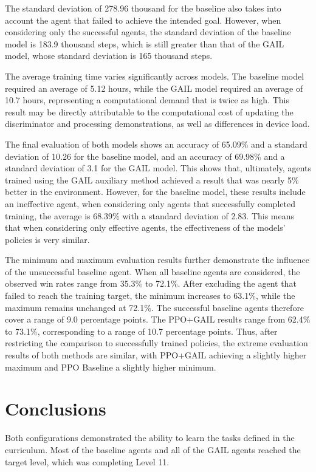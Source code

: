 The standard deviation of 278.96 thousand for the baseline also takes into account the agent that failed to achieve the intended goal. However, when considering only the successful agents, the standard deviation of the baseline model is 183.9 thousand steps, which is still greater than that of the GAIL model, whose standard deviation is 165 thousand steps.

The average training time varies significantly across models. The baseline model required an average of 5.12 hours, while the GAIL model required an average of 10.7 hours, representing a computational demand that is twice as high. This result may be directly attributable to the computational cost of updating the discriminator and processing demonstrations, as well as differences in device load.

The final evaluation of both models shows an accuracy of 65.09\% and a standard deviation of 10.26 for the baseline model, and an accuracy of 69.98\% and a standard deviation of 3.1 for the GAIL model. This shows that, ultimately, agents trained using the GAIL auxiliary method achieved a result that was nearly 5\% better in the environment. However, for the baseline model, these results include an ineffective agent, when considering only agents that successfully completed training, the average is 68.39\% with a standard deviation of 2.83. This means that when considering only effective agents, the effectiveness of the models’ policies is very similar.

The minimum and maximum evaluation results further demonstrate the influence of the unsuccessful baseline agent. When all baseline agents are considered, the observed win rates range from 35.3\% to 72.1\%. After excluding the agent that failed to reach the training target, the minimum increases to 63.1\%, while the maximum remains unchanged at 72.1\%. The successful baseline agents therefore cover a range of 9.0 percentage points. The PPO+GAIL results range from 62.4\% to 73.1\%, corresponding to a range of 10.7 percentage points. Thus, after restricting the comparison to successfully trained policies, the extreme evaluation results of both methods are similar, with PPO+GAIL achieving a slightly higher maximum and PPO Baseline a slightly higher minimum.

\section{Conclusions}

Both configurations demonstrated the ability to learn the tasks defined in the curriculum. Most of the baseline agents and all of the GAIL agents reached the target level, which was completing Level 11.

